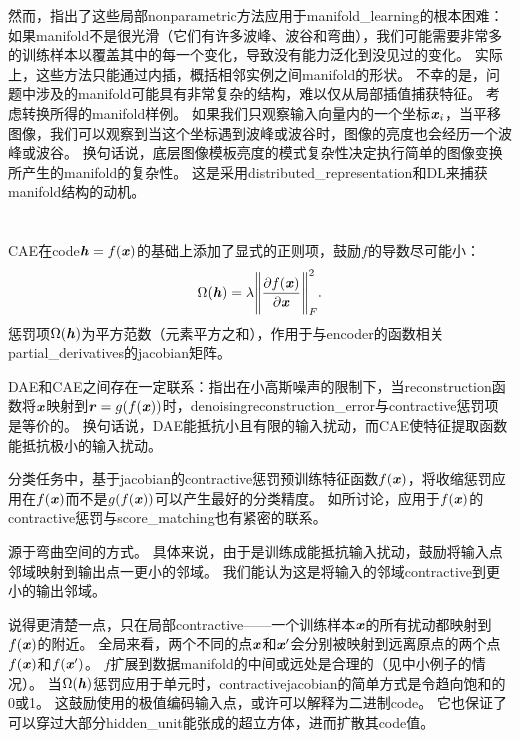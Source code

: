 然而，\citet{Bengio+Monperrus-2005}指出了这些局部\gls{nonparametric}方法应用于\gls{manifold_learning}的根本困难：如果\gls{manifold}不是很光滑（它们有许多波峰、波谷和弯曲），我们可能需要非常多的训练样本以覆盖其中的每一个变化，导致没有能力泛化到没见过的变化。
实际上，这些方法只能通过内插，概括相邻实例之间\gls{manifold}的形状。
不幸的是，问题中涉及的\gls{manifold}可能具有非常复杂的结构，难以仅从局部插值捕获特征。
考虑转换所得的\gls{manifold}样例。
如果我们只观察输入向量内的一个坐标$\boldsymbol{\mathit{x}}_i$，当平移图像，我们可以观察到当这个坐标遇到波峰或波谷时，图像的亮度也会经历一个波峰或波谷。
换句话说，底层图像模板亮度的模式复杂性决定执行简单的图像变换所产生的\gls{manifold}的复杂性。
这是采用\gls{distributed_representation}和\gls{DL}来捕获\gls{manifold}结构的动机。


\section{}
\label{sec:contractive_autoencoders}
\gls{CAE}\citep{Rifai+al-2011-small,Salah+al-2011-small}在\gls{code}$\boldsymbol{\mathit{h}} = f(\boldsymbol{\mathit{x}})$的基础上添加了显式的正则项，鼓励$f$的导数尽可能小：
\begin{align}
 \Omega(\boldsymbol{\mathit{h}}) = \lambda \Bigg\| \frac{\partial f(\boldsymbol{\mathit{x}})}{\partial \boldsymbol{\mathit{x}}} \Bigg\|_F^2 .
\end{align}
惩罚项$\Omega(\boldsymbol{\mathit{h}})$为平方范数（元素平方之和），作用于与\gls{encoder}的函数相关\gls{partial_derivatives}的\gls{jacobian}矩阵。


\gls{DAE}和\gls{CAE}之间存在一定联系：\citet{Alain+Bengio-ICLR2013-small}指出在小高斯噪声的限制下，当\gls{reconstruction}函数将$\boldsymbol{\mathit{x}}$映射到$\boldsymbol{\mathit{r}} = g(f(\boldsymbol{\mathit{x}}))$时，\gls{denoising}\gls{reconstruction_error}与\gls{contractive}惩罚项是等价的。
换句话说，\gls{DAE}能抵抗小且有限的输入扰动，而\gls{CAE}使特征提取函数能抵抗极小的输入扰动。

分类任务中，基于\gls{jacobian}的\gls{contractive}惩罚预训练特征函数$f(\boldsymbol{\mathit{x}})$，将收缩惩罚应用在$f(\boldsymbol{\mathit{x}})$而不是$g(f(\boldsymbol{\mathit{x}}))$可以产生最好的分类精度。
如所讨论，应用于$f(\boldsymbol{\mathit{x}})$的\gls{contractive}惩罚与\gls{score_matching}也有紧密的联系。

源于弯曲空间的方式。
具体来说，由于是训练成能抵抗输入扰动，鼓励将输入点邻域映射到输出点一更小的邻域。
我们能认为这是将输入的邻域\gls{contractive}到更小的输出邻域。


说得更清楚一点，只在局部\gls{contractive}——一个训练样本$\boldsymbol{\mathit{x}}$的所有扰动都映射到$f(\boldsymbol{\mathit{x}})$的附近。
全局来看，两个不同的点$\boldsymbol{\mathit{x}}$和$\boldsymbol{\mathit{x}}'$会分别被映射到远离原点的两个点$f(\boldsymbol{\mathit{x}})$和$f(\boldsymbol{\mathit{x}}')$。
$f$扩展到数据\gls{manifold}的中间或远处是合理的（见中小例子的情况）。
当$\Omega(\boldsymbol{\mathit{h}})$惩罚应用于单元时，\gls{contractive}\gls{jacobian}的简单方式是令趋向饱和的0或1。
这鼓励使用的极值编码输入点，或许可以解释为二进制\gls{code}。
它也保证了可以穿过大部分\gls{hidden_unit}能张成的超立方体，进而扩散其\gls{code}值。

